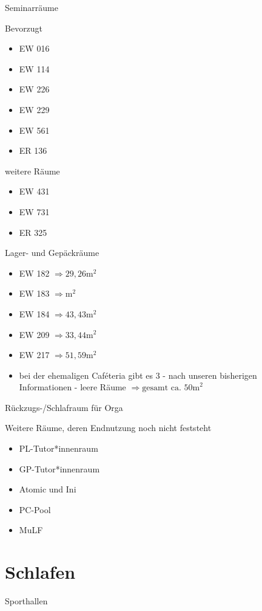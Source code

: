 \documentclass[compress,]{beamer}
\begin{document}
\begin{frame}{Seminarräume}
\begin{block}{Bevorzugt}
\begin{itemize}
	\item EW 016
	\item EW 114
	\item EW 226
	\item EW 229
	\item EW 561
	\item ER 136
\end{itemize}
\end{block}
\end{frame}

\begin{frame}
\begin{block}{weitere Räume}
\begin{itemize}
	\item EW 431
	\item EW 731
	\item ER 325
\end{itemize}
\end{block}
\end{frame}

\begin{frame}{Lager- und Gepäckräume}
\begin{itemize}
	\item EW 182 $\Rightarrow 29,26 \mbox{m}^{2}$
	\item EW 183 $\Rightarrow  \mbox{m}^{2}$
	\item EW 184 $\Rightarrow 43,43 \mbox{m}^{2}$
	\item EW 209 $\Rightarrow 33,44 \mbox{m}^{2}$
	\item EW 217 $\Rightarrow 51,59 \mbox{m}^{2}$
	\item bei der ehemaligen Caféteria gibt es 3 - nach unseren bisherigen Informationen - leere Räume $\Rightarrow\mbox{gesamt ca. 50m}^{2}$
\end{itemize}
\end{frame}

\begin{frame}{Rückzugs-/Schlafraum für Orga}
\end{frame}

\begin{frame}{Weitere Räume, deren Endnutzung noch nicht feststeht}
\begin{itemize}
	\item PL-Tutor*innenraum
	\item GP-Tutor*innenraum
	\item Atomic und Ini
	\item PC-Pool
	\item MuLF
\end{itemize}
\end{frame}


\section{Schlafen}


\begin{frame}{Sporthallen}
\end{frame}
\end{document}

